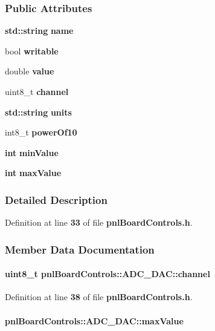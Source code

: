 \subsubsection*{Public Attributes}
\begin{DoxyCompactItemize}
\item 
{\bf std\+::string} {\bf name}
\item 
bool {\bf writable}
\item 
double {\bf value}
\item 
uint8\+\_\+t {\bf channel}
\item 
{\bf std\+::string} {\bf units}
\item 
int8\+\_\+t {\bf power\+Of10}
\item 
{\bf int} {\bf min\+Value}
\item 
{\bf int} {\bf max\+Value}
\end{DoxyCompactItemize}


\subsubsection{Detailed Description}


Definition at line {\bf 33} of file {\bf pnl\+Board\+Controls.\+h}.



\subsubsection{Member Data Documentation}
\paragraph[{channel}]{\setlength{\rightskip}{0pt plus 5cm}uint8\+\_\+t pnl\+Board\+Controls\+::\+A\+D\+C\+\_\+\+D\+A\+C\+::channel}\label{structpnlBoardControls_1_1ADC__DAC_ac40ae601e96b10079fa05a4d6d1eb9b3}


Definition at line {\bf 38} of file {\bf pnl\+Board\+Controls.\+h}.

\paragraph[{max\+Value}]{ pnl\+Board\+Controls\+::\+A\+D\+C\+\_\+\+D\+A\+C\+::max\+Value}\label{structpnlBoardControls_1_1ADC__DAC_ad35a3ac8289f36730916498c93227637}


